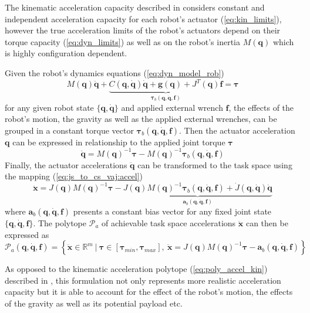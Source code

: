 The kinematic acceleration capacity described in  considers constant and independent acceleration capacity for each robot's actuator (\ref{eq:kin_limits}), however the true acceleration limits of the robot's actuators depend on their torque capacity (\ref{eq:dyn_limits}) as well as on the robot's inertia 
$M(\bm{q})$ which is highly configuration dependent. 

Given the robot's dynamics equations (\ref{eq:dyn_model_rob}) 
\begin{equation}
M(\bm{q})\ddot{\bm{q}} + \underbrace{C(\bm{q},\dot{\bm{q}})\dot{\bm{q}} + \bm{g}(\bm{q}) + J^T(\bm{q})\bm{f}}_{\bm{\tau}_b(\bm{q},\dot{\bm{q}},\bm{f}) } = \bm{\tau} 
\end{equation}
for any given robot state $\{\bm{q},\dot{\bm{q}}\}$ and applied external wrench $\bm{f}$, the effects of the robot's motion, the gravity as well as the applied external wrenches, can be grouped in a constant torque vector $\bm{\tau}_b(\bm{q},\dot{\bm{q}},\bm{f})$. Then the actuator acceleration $\bm{q}$ can be expressed in relationship to the applied joint torque $\bm{\tau}$
\begin{equation}
    \ddot{\bm{q}} = M(\bm{q})^{-1}\bm{\tau} - M(\bm{q})^{-1}\bm{\tau}_b(\bm{q},\dot{\bm{q}},\bm{f})
\end{equation}
Finally, the actuator accelerations $\ddot{\bm{q}}$ can be transformed to the task space using the mapping (\ref{eq:js_to_cs_vaj:accel})
\begin{equation}
    \ddot{\bm{x}} = J(\bm{q})M(\bm{q})^{-1}\bm{\tau} - \underbrace{J(\bm{q})M(\bm{q})^{-1}\bm{\tau}_b(\bm{q},\dot{\bm{q}},\bm{f}) + \dot{J}(\bm{q}, \dot{\bm{q}})\dot{\bm{q}}}_{\bm{a}_b(\bm{q},\dot{\bm{q}},\bm{f})}
\end{equation}
where $\bm{a}_b(\bm{q},\dot{\bm{q}},\bm{f})$ presents a constant bias vector for any fixed joint state $\{\bm{q},\dot{\bm{q}},\bm{f}\}$. The polytope $\mathcal{P}_a$ of achievable task space accelerations $\ddot{\bm{x}}$ can then be expressed as
\begin{equation}
    \mathcal{P}_a(\bm{q},\dot{\bm{q}},\bm{f}) = \left\{ \ddot{\bm{x}} \in \mathbb{R}^m ~|~ \bm{\tau}\in\left[\bm{\tau}_{min}, \bm{\tau}_{max} \right], ~ \ddot{\bm{x}} = J(\bm{q})M(\bm{q})^{-1}\bm{\tau} - \bm{a}_b(\bm{q},\dot{\bm{q}},\bm{f}) \right\}
    \label{eq:pol_accleration_rob}
\end{equation}

As opposed to the kinematic acceleration polytope (\ref{eq:poly_accel_kin}) described in , this formulation not only represents more realistic acceleration capacity but it is able to account for the effect of the robot's motion, the effects of the gravity as well as its potential payload etc. 

